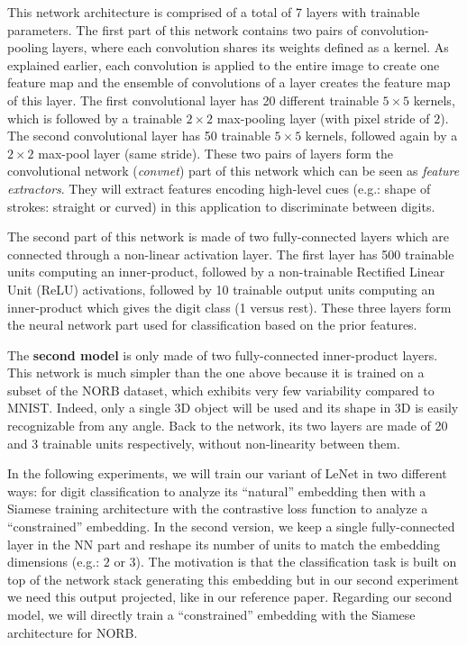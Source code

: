 \documentclass[a4paper,12pt]{report}
\newcommand{\eg}{e.g.}
\begin{document}
This network architecture is comprised of a total of 7 layers with trainable parameters.
The first part of this network contains two pairs of convolution-pooling layers, where each convolution shares its weights defined as a kernel.
As explained earlier, each convolution is applied to the entire image to create one feature map and the ensemble of convolutions of a layer creates the feature map of this layer.
The first convolutional layer has 20 different trainable $5 \times 5$ kernels, which is followed by a trainable $2 \times 2$ max-pooling layer (with pixel stride of $2$).
The second convolutional layer has 50 trainable $5 \times 5$ kernels, followed again by a $2 \times 2$ max-pool layer (same stride).
These two pairs of layers form the convolutional network ({\em convnet}) part of this network which can be seen as {\em feature extractors}.
They will extract features encoding high-level cues (\eg: shape of strokes: straight or curved) in this application to discriminate between digits.

The second part of this network is made of two fully-connected layers which are connected through a non-linear activation layer.
The first layer has 500 trainable units computing an inner-product, followed by a non-trainable Rectified Linear Unit (ReLU) activations\cite{nair2010rectified}, followed by 10 trainable output units computing an inner-product which gives the digit class (1 versus rest).
These three layers form the neural network part used for classification based on the prior features.

The {\bf second model} is only made of two fully-connected inner-product layers.
This network is much simpler than the one above because it is trained on a subset of the NORB dataset, which exhibits very few variability compared to MNIST.
Indeed, only a single 3D object will be used and its shape in 3D is easily recognizable from any angle.
Back to the network, its two layers are made of 20 and 3 trainable units respectively, without non-linearity between them. %

In the following experiments, we will train our variant of LeNet in two different ways: for digit classification to analyze its ``natural'' embedding then with a Siamese training architecture with the contrastive loss function to analyze a ``constrained'' embedding.
In the second version, we keep a single fully-connected layer in the NN part and reshape its number of units to match the embedding dimensions (\eg: $2$ or $3$).
The motivation is that the classification task is built on top of the network stack generating this embedding but in our second experiment we need this output projected, like in our reference paper.
Regarding our second model, we will directly train a ``constrained'' embedding with the Siamese architecture for NORB.
\end{document}
